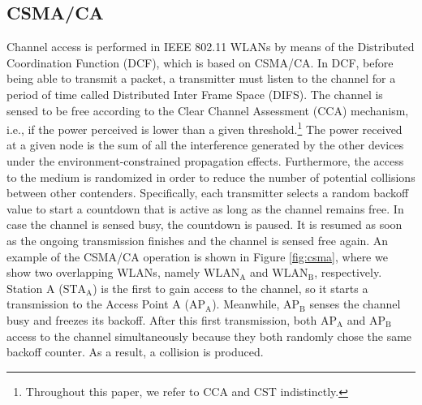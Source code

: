 \documentclass{article}
\begin{document}
\subsection{CSMA/CA}
\label{section:csma}	
Channel access is performed in IEEE 802.11 WLANs by means of the Distributed Coordination Function (DCF), which is based on CSMA/CA. In DCF, before being able to transmit a packet, a transmitter must listen to the channel for a period of time called Distributed Inter Frame Space (DIFS). The channel is sensed to be free according to the Clear Channel Assessment (CCA) mechanism, i.e., if the power perceived is lower than a given threshold.\footnote{Throughout this paper, we refer to CCA and CST indistinctly.} The power received at a given node is the sum of all the interference generated by the other devices under the environment-constrained propagation effects. Furthermore, the access to the medium is randomized in order to reduce the number of potential collisions between other contenders. Specifically, each transmitter selects a random backoff value to start a countdown that is active as long as the channel remains free. In case the channel is sensed busy, the countdown is paused. It is resumed as soon as the ongoing transmission finishes and the channel is sensed free again. An example of the CSMA/CA operation is shown in Figure \ref{fig:csma}, where we show two overlapping WLANs, namely $\text{WLAN}_{\text{A}}$ and $\text{WLAN}_{\text{B}}$, respectively. Station A ($\text{STA}_{\text{A}}$) is the first to gain access to the channel, so it starts a transmission to the Access Point A ($\text{AP}_\text{A}$). Meanwhile, $\text{AP}_{\text{B}}$ senses the channel busy and freezes its backoff. After this first transmission, both $\text{AP}_{\text{A}}$ and $\text{AP}_{\text{B}}$ access to the channel simultaneously because they both randomly chose the same backoff counter. As a result, a collision is produced.
\end{document}
